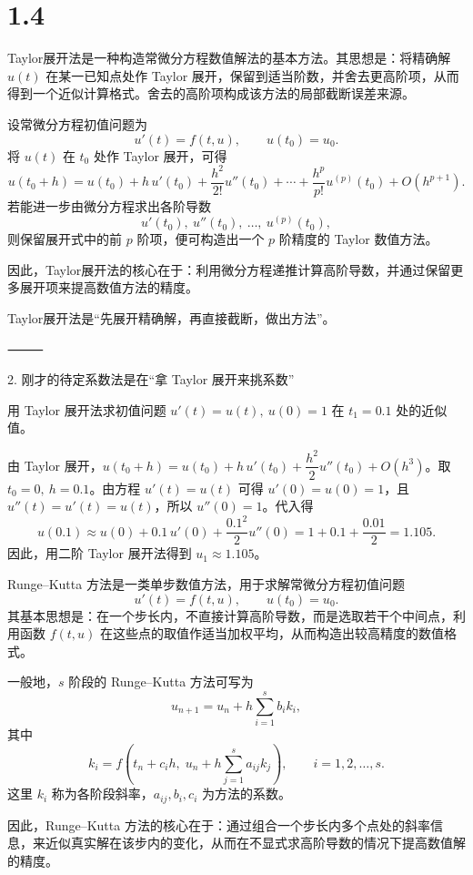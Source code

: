 \section{1.4}
\begin{definition}[Taylor展开法]
Taylor展开法是一种构造常微分方程数值解法的基本方法。其思想是：将精确解 \(u(t)\) 在某一已知点处作 Taylor 展开，保留到适当阶数，并舍去更高阶项，从而得到一个近似计算格式。舍去的高阶项构成该方法的局部截断误差来源。

设常微分方程初值问题为
\[
u'(t)=f(t,u),\qquad u(t_0)=u_0.
\]
将 \(u(t)\) 在 \(t_0\) 处作 Taylor 展开，可得
\[
u(t_0+h)
=
u(t_0)
+h\,u'(t_0)
+\frac{h^2}{2!}u''(t_0)
+\cdots
+\frac{h^p}{p!}u^{(p)}(t_0)
+O(h^{p+1}).
\]
若能进一步由微分方程求出各阶导数
\[
u'(t_0),\ u''(t_0),\ \dots,\ u^{(p)}(t_0),
\]
则保留展开式中的前 \(p\) 阶项，便可构造出一个 \(p\) 阶精度的 Taylor 数值方法。

因此，Taylor展开法的核心在于：利用微分方程递推计算高阶导数，并通过保留更多展开项来提高数值方法的精度。
\end{definition}
\begin{note}
    Taylor展开法是“先展开精确解，再直接截断，做出方法”。

⸻

2. 刚才的待定系数法是在“拿 Taylor 展开来挑系数”

\end{note}
\begin{example}
用 Taylor 展开法求初值问题 \(u'(t)=u(t),\ u(0)=1\) 在 \(t_1=0.1\) 处的近似值。

由 Taylor 展开，\(u(t_0+h)=u(t_0)+h\,u'(t_0)+\dfrac{h^2}{2}u''(t_0)+O(h^3)\)。取 \(t_0=0,\ h=0.1\)。由方程 \(u'(t)=u(t)\) 可得 \(u'(0)=u(0)=1\)，且 \(u''(t)=u'(t)=u(t)\)，所以 \(u''(0)=1\)。代入得
\[
u(0.1)\approx u(0)+0.1\,u'(0)+\frac{0.1^2}{2}u''(0)=1+0.1+\frac{0.01}{2}=1.105.
\]
因此，用二阶 Taylor 展开法得到 \(u_1\approx 1.105\)。
\end{example}
\begin{definition}
Runge--Kutta 方法是一类单步数值方法，用于求解常微分方程初值问题
\[
u'(t)=f(t,u),\qquad u(t_0)=u_0.
\]
其基本思想是：在一个步长内，不直接计算高阶导数，而是选取若干个中间点，利用函数 \(f(t,u)\) 在这些点的取值作适当加权平均，从而构造出较高精度的数值格式。

一般地，\(s\) 阶段的 Runge--Kutta 方法可写为
\[
u_{n+1}=u_n+h\sum_{i=1}^s b_i k_i,
\]
其中
\[
k_i=f\!\left(t_n+c_i h,\;u_n+h\sum_{j=1}^s a_{ij}k_j\right),
\qquad i=1,2,\dots,s.
\]
这里 \(k_i\) 称为各阶段斜率，\(a_{ij},b_i,c_i\) 为方法的系数。

因此，Runge--Kutta 方法的核心在于：通过组合一个步长内多个点处的斜率信息，来近似真实解在该步内的变化，从而在不显式求高阶导数的情况下提高数值解的精度。
\end{definition}
